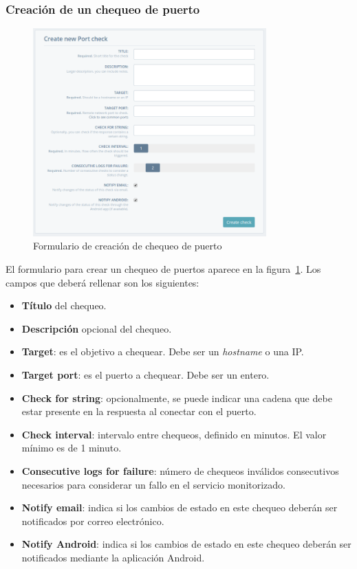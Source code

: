 \subsubsection{Creación de un chequeo de puerto}

\begin{figure}[hbtp]
  \centering
  \includegraphics[width=0.8\textwidth]{apendice_manual_usuario/pantalla_crear_port.png}
  \caption{Formulario de creación de chequeo de puerto}
  \label{fig:crear-port}
\end{figure}

El formulario para crear un chequeo de puertos aparece en la
figura~\ref{fig:crear-port}. Los campos que deberá rellenar son los siguientes:

\begin{itemize}
\item \textbf{Título} del chequeo.
\item \textbf{Descripción} opcional del chequeo.
\item \textbf{Target}: es el objetivo a chequear. Debe ser un \textit{hostname} o una IP.
\item \textbf{Target port}: es el puerto a chequear. Debe ser un entero.
\item \textbf{Check for string}: opcionalmente, se puede indicar una cadena que
  debe estar presente en la respuesta al conectar con el puerto.
\item \textbf{Check interval}: intervalo entre chequeos, definido en minutos. El
  valor mínimo es de 1 minuto.
\item \textbf{Consecutive logs for failure}: número de chequeos inválidos
  consecutivos necesarios para considerar un fallo en el servicio monitorizado.
\item \textbf{Notify email}: indica si los cambios de estado en este chequeo
  deberán ser notificados por correo electrónico.
\item \textbf{Notify Android}: indica si los cambios de estado en este chequeo
  deberán ser notificados mediante la aplicación Android.
\end{itemize}


